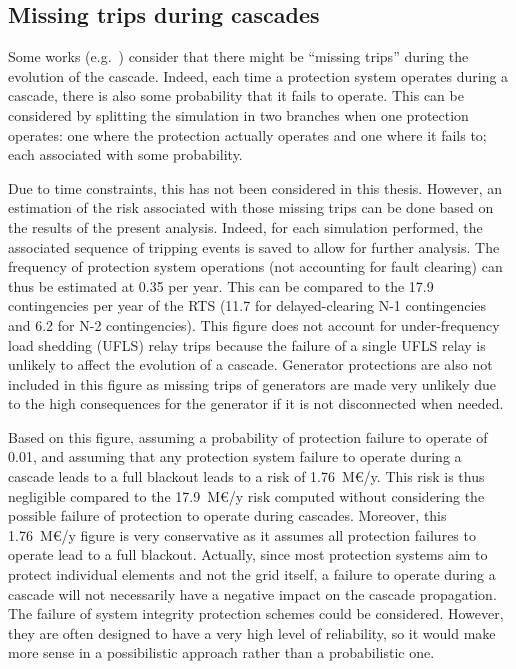 \subsection{Missing trips during cascades}
\label{sec:PDSA_results_missing_trips}

Some works (e.g.~\cite{Faghihi, DCATphase1}) consider that there might be ``missing trips'' during the evolution of the cascade. Indeed, each time a protection system operates during a cascade, there is also some probability that it fails to operate. This can be considered by splitting the simulation in two branches when one protection operates: one where the protection actually operates and one where it fails to; each associated with some probability.

Due to time constraints, this has not been considered in this thesis. However, an estimation of the risk associated with those missing trips can be done based on the results of the present analysis. Indeed, for each simulation performed, the associated sequence of tripping events is saved to allow for further analysis. The frequency of protection system operations (not accounting for fault clearing) can thus be estimated at 0.35 per year. This can be compared to the 17.9 contingencies per year of the RTS (11.7 for delayed-clearing N-1 contingencies and 6.2 for N-2 contingencies). This figure does not account for under-frequency load shedding (UFLS) relay trips because the failure of a single UFLS relay is unlikely to affect the evolution of a cascade. Generator protections are also not included in this figure as missing trips of generators are made very unlikely due to the high consequences for the generator if it is not disconnected when needed.

Based on this figure, assuming a probability of protection failure to operate of 0.01, and assuming that any protection system failure to operate during a cascade leads to a full blackout leads to a risk of 1.76~M€/y. This risk is thus negligible compared to the 17.9~M€/y risk computed without considering the possible failure of protection to operate during cascades. Moreover, this 1.76~M€/y figure is very conservative as it assumes all protection failures to operate lead to a full blackout. Actually, since most protection systems aim to protect individual elements and not the grid itself, a failure to operate during a cascade will not necessarily have a negative impact on the cascade propagation. The failure of system integrity protection schemes could be considered. However, they are often designed to have a very high level of reliability, so it would make more sense in a possibilistic approach rather than a probabilistic one.

